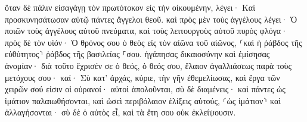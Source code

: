 \documentclass{openreader}
\begin{document}
ὅταν δὲ πάλιν εἰσαγάγῃ τὸν πρωτότοκον εἰς τὴν οἰκουμένην, λέγει· Καὶ προσκυνησάτωσαν αὐτῷ πάντες ἄγγελοι θεοῦ. 
καὶ πρὸς μὲν τοὺς ἀγγέλους λέγει· Ὁ ποιῶν τοὺς ἀγγέλους αὐτοῦ πνεύματα, καὶ τοὺς λειτουργοὺς αὐτοῦ πυρὸς φλόγα· 
πρὸς δὲ τὸν υἱόν· Ὁ θρόνος σου ὁ θεὸς εἰς τὸν αἰῶνα τοῦ αἰῶνος, ⸂καὶ ἡ ῥάβδος τῆς εὐθύτητος⸃ ῥάβδος τῆς βασιλείας ⸀σου. 
ἠγάπησας δικαιοσύνην καὶ ἐμίσησας ἀνομίαν· διὰ τοῦτο ἔχρισέν σε ὁ θεός, ὁ θεός σου, ἔλαιον ἀγαλλιάσεως παρὰ τοὺς μετόχους σου· 
καί· Σὺ κατ’ ἀρχάς, κύριε, τὴν γῆν ἐθεμελίωσας, καὶ ἔργα τῶν χειρῶν σού εἰσιν οἱ οὐρανοί· 
αὐτοὶ ἀπολοῦνται, σὺ δὲ διαμένεις· καὶ πάντες ὡς ἱμάτιον παλαιωθήσονται, 
καὶ ὡσεὶ περιβόλαιον ἑλίξεις αὐτούς, ⸂ὡς ἱμάτιον⸃ καὶ ἀλλαγήσονται· σὺ δὲ ὁ αὐτὸς εἶ, καὶ τὰ ἔτη σου οὐκ ἐκλείψουσιν. 
\end{document}
